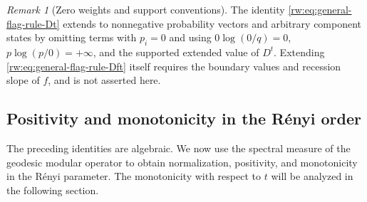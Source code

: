 \documentclass[11pt]{article}
\theoremstyle{remark}
\newtheorem{remark}[remark]{Remark}
\newcommand{\1}{\mathbbm{1}}
\begin{document}
\begin{remark}[Zero weights and support conventions]
The identity \eqref{rw:eq:general-flag-rule-Dt} extends to
nonnegative probability vectors and arbitrary component states by
omitting terms with $p_i=0$ and using
$0\log(0/q)=0$, $p\log(p/0)=+\infty$, and the supported extended value
of $D^t$.  Extending \eqref{rw:eq:general-flag-rule-Dft} itself
requires the boundary values and recession slope of $f$, and is not
asserted here.
\end{remark}


\subsection{Positivity and monotonicity in the R\'enyi order}
\label{rw:subsec:spectral-properties}

The preceding identities are algebraic.  We now use the spectral
measure of the geodesic modular operator to obtain normalization,
positivity, and monotonicity in the R\'enyi parameter. The monotonicity with respect to $t$ will be analyzed in the following section. 
\end{document}
